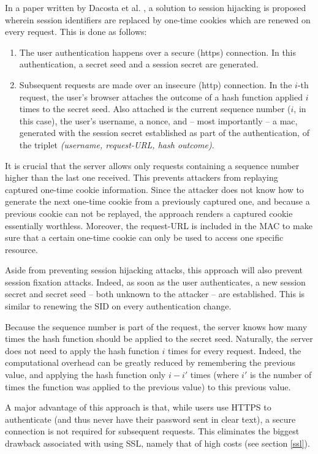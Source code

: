 In a paper written by Dacosta et al. \cite{Dacosta2011}, a solution to session hijacking is proposed wherein session identifiers are replaced by one-time cookies which are renewed on every request. This is done as follows:
\begin{enumerate}
	\item The user authentication happens over a secure (\gls{https}) connection. In this authentication, a secret seed and a session secret are generated.
	\item Subsequent requests are made over an insecure (\gls{http}) connection. In the $i$-th request, the user's browser attaches the outcome of a hash function  applied $i$ times to the secret seed. Also attached is the current sequence number ($i$, in this case), the user's username, a nonce, and -- most importantly -- a \gls{mac}, generated with the session secret established as part of the authentication, of the triplet \emph{(username, request-URL, hash outcome)}.
\end{enumerate}
It is crucial that the server allows only requests containing a sequence number higher than the last one received. This prevents attackers from replaying captured one-time cookie information. Since the attacker does not know how to generate the next one-time cookie from a previously captured one, and because a previous cookie can not be replayed, the approach renders a captured cookie essentially worthless. Moreover, the request-URL is included in the MAC to make sure that a certain one-time cookie can only be used to access one specific resource.

Aside from preventing session hijacking attacks, this approach will also prevent session fixation attacks. Indeed, as soon as the user authenticates, a new session secret and secret seed -- both unknown to the attacker -- are established. This is similar to renewing the SID on every authentication change.

Because the sequence number is part of the request, the server knows how many times the hash function should be applied to the secret seed. Naturally, the server does not need to apply the hash function $i$ times for every request. Indeed, the computational overhead can be greatly reduced by remembering the previous value, and applying the hash function only $i - i'$ times (where $i'$ is the number of times the function was applied to the previous value) to this previous value.

A major advantage of this approach is that, while users use HTTPS to authenticate (and thus never have their password sent in clear text), a secure connection is not required for subsequent requests. This eliminates the biggest drawback associated with using SSL, namely that of high costs (see section \ref{ssl}).

